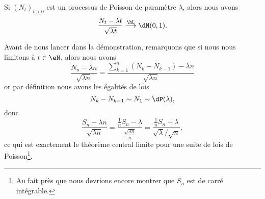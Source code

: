\begin{theorem}  \label{ThoCSuLLo}
	Si \( (N_t)_{t>0}\) est un processus de Poisson de paramètre \( \lambda\), alors nous avons
	\begin{equation}
		\frac{ N_t-\lambda t }{ \sqrt{\lambda t} }\stackrel{\hL}{\longrightarrow}\dN(0,1).
	\end{equation}
\end{theorem}

\begin{remark}
	Avant de nous lancer dans la démonstration, remarquons que si nous nous limitons à \( t\in \eN\), alors nous avons
	\begin{equation}
		\frac{ N_n-\lambda n }{ \sqrt{\lambda n} }=\frac{ \sum_{k=1}^n(N_k-N_{k-1})-\lambda n }{ \sqrt{\lambda n} }
	\end{equation}
	or par définition nous avons les égalités de lois
	\begin{equation}
		N_k-N_{k-1}\sim N_1\sim \dP(\lambda),
	\end{equation}
	donc
	\begin{equation}
		\frac{ S_n-\lambda n }{ \sqrt{\lambda n} }=\frac{ \frac{1}{ n }S_n-\lambda }{ \frac{ \sqrt{\lambda n} }{ n } }=\frac{ \frac{1}{ n }S_n-\lambda }{ \sqrt{\lambda}/\sqrt{n} },
	\end{equation}
	ce qui est exactement le théorème central limite pour une suite de lois de Poisson\footnote{Au fait près que nous devrions encore montrer que \( S_n\) est de carré intégrable.}.
\end{remark}

